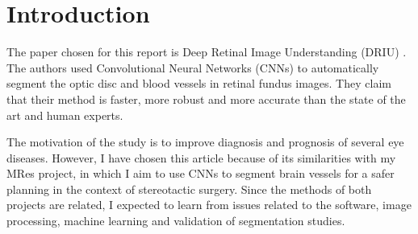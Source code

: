 \section{Introduction}


The paper chosen for this report is Deep Retinal Image Understanding (DRIU) \cite{maninis_deep_2016}. The authors used Convolutional Neural Networks (CNNs) to automatically segment the optic disc and blood vessels in retinal fundus images. They claim that their method is faster, more robust and more accurate than the state of the art and human experts.

The motivation of the study is to improve diagnosis and prognosis of several eye diseases. However, I have chosen this article because of its similarities with my MRes project, in which I aim to use CNNs to segment brain vessels for a safer planning in the context of stereotactic surgery. Since the methods of both projects are related, I expected to learn from issues related to the software, image processing, machine learning and validation of segmentation studies.
